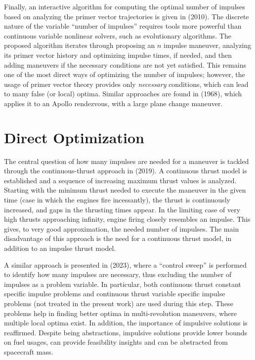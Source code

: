 Finally, an interactive algorithm for computing the optimal number of impulses based on analyzing the primer vector trajectories is given in \citeauthor{interactive_primer_vector} (2010). The discrete nature of the variable ``number of impulses'' requires tools more powerful than continuous variable nonlinear solvers, such as evolutionary algorithms. The proposed algorithm iterates through proposing an \(n\) impulse maneuver, analyzing its primer vector history and optimizing impulse times, if needed, and then adding maneuvers if the necessary conditions are not yet satisfied. This remains one of the most direct ways of optimizing the number of impulses; however, the usage of primer vector theory provides only \textit{necessary} conditions, which can lead to many false (or local) optima. Similar approaches are found in \citeauthor{efficient_n_impulse} (1968), which applies it to an Apollo rendezvous, with a large plane change maneuver.

\section{Direct Optimization}

The central question of how many impulses are needed for a maneuver is tackled through the continuous-thrust approach in \citeauthor{how_many_impulses} (2019). A continuous thrust model is established and a sequence of increasing maximum thrust values is analyzed. Starting with the minimum thrust needed to execute the maneuver in the given time (case in which the engines fire incessantly), the thrust is continuously increased, and gaps in the thrusting times appear. In the limiting case of very high thrusts approaching infinity, engine firing closely resembles an impulse. This gives, to very good approximation, the needed number of impulses. The main disadvantage of this approach is the need for a continuous thrust model, in addition to an impulse thrust model. 

A similar approach is presented in \citeauthor{mult_rev_many_imp} (2023), where a ``control sweep'' is performed to identify how many impulses are necessary, thus excluding the number of impulses as a problem variable. In particular, both continuous thrust constant specific impulse problems and continuous thrust variable specific impulse problems (not treated in the present work) are used during this step. These problems help in finding better optima in multi-revolution maneuvers, where multiple local optima exist. In addition, the importance of impulsive solutions is reaffirmed. Despite being abstractions, impulsive solutions provide lower bounds on fuel usages, can provide feasibility insights and can be abstracted from spacecraft mass.

